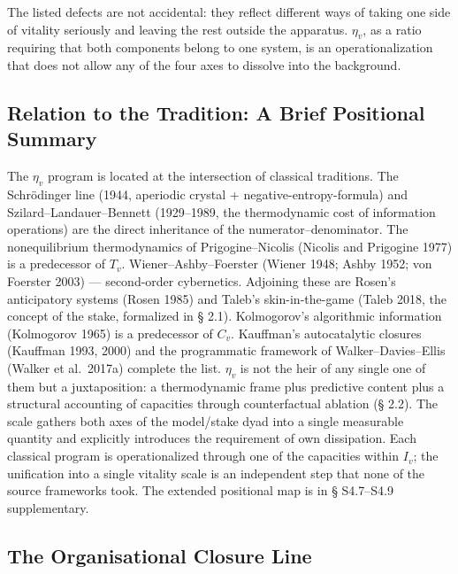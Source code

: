 \documentclass[pdflatex,sn-mathphys-ay]{sn-jnl}
\begin{document}
The listed defects are not accidental: they reflect different ways of taking one side of vitality seriously and leaving the rest outside the apparatus. \(\eta_v\), as a ratio requiring that both components belong to one system, is an operationalization that does not allow any of the four axes to dissolve into the background.

\subsection{Relation to the Tradition: A Brief Positional Summary}\label{relation-to-the-tradition-a-brief-positional-summary}

The \(\eta_v\) program is located at the intersection of classical traditions. The Schrödinger line (1944, aperiodic crystal + negative-entropy-formula) and Szilard--Landauer--Bennett (1929--1989, the thermodynamic cost of information operations) are the direct inheritance of the numerator--denominator. The nonequilibrium thermodynamics of Prigogine--Nicolis (Nicolis and Prigogine 1977) is a predecessor of \(T_v\). Wiener--Ashby--Foerster (Wiener 1948; Ashby 1952; von Foerster 2003) --- second-order cybernetics. Adjoining these are Rosen's anticipatory systems (Rosen 1985) and Taleb's skin-in-the-game (Taleb 2018, the concept of the stake, formalized in § 2.1). Kolmogorov's algorithmic information (Kolmogorov 1965) is a predecessor of \(C_v\). Kauffman's autocatalytic closures (Kauffman 1993, 2000) and the programmatic framework of Walker--Davies--Ellis (Walker et al.~2017a) complete the list. \(\eta_v\) is not the heir of any single one of them but a juxtaposition: a thermodynamic frame plus predictive content plus a structural accounting of capacities through counterfactual ablation (§ 2.2). The scale gathers both axes of the model/stake dyad into a single measurable quantity and explicitly introduces the requirement of own dissipation. Each classical program is operationalized through one of the capacities within \(I_v\); the unification into a single vitality scale is an independent step that none of the source frameworks took. The extended positional map is in § S4.7--S4.9 supplementary.

\subsection{The Organisational Closure Line}\label{the-organisational-closure-line}
\end{document}
